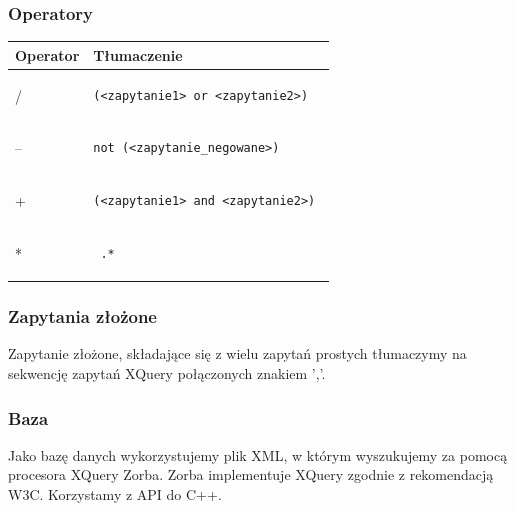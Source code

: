 \subsubsection{Operatory}
\begin{longtable}{|p{1in}|p{3in}|}
\hline
{\bf Operator} & {\bf Tłumaczenie}\\
\hline
\endhead
/ & \begin{verbatim}(<zapytanie1> or <zapytanie2>) \end{verbatim} \\
\hline
-- & \begin{verbatim}not (<zapytanie_negowane>) \end{verbatim}\\  
\hline
+ & \begin{verbatim}(<zapytanie1> and <zapytanie2>) \end{verbatim}\\ 
\hline
* & \begin{verbatim} .*\end{verbatim}  \\ 
\hline
\end{longtable}

\subsubsection{Zapytania złożone}
Zapytanie złożone, składające się z wielu zapytań prostych tłumaczymy na sekwencję zapytań XQuery połączonych znakiem ','.

\subsubsection{Baza}
Jako bazę danych wykorzystujemy plik XML, w którym wyszukujemy za pomocą procesora XQuery Zorba. Zorba implementuje XQuery zgodnie z rekomendacją W3C.
Korzystamy z API do C++.